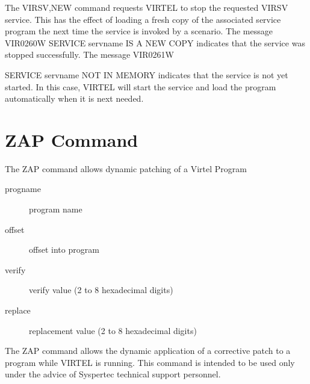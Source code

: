\documentclass[letterpaper,10pt,english]{sphinxmanual}
\begin{document}
The VIRSV,NEW command requests VIRTEL to stop the requested VIRSV service. This has the effect of loading a fresh copy of the associated service program the next time the service is invoked by a scenario. The message VIR0260W SERVICE servname IS A NEW COPY indicates that the service was stopped successfully. The message VIR0261W

SERVICE servname NOT IN MEMORY indicates that the service is not yet started. In this case, VIRTEL will start the service and load the  program automatically when it is next needed.

\ignorespaces 

\section{ZAP Command}
\label{\detokenize{audit_operations_ and_performance:zap-command}}\label{\detokenize{audit_operations_ and_performance:index-33}}
The ZAP command allows dynamic patching of a Virtel Program

\begin{sphinxVerbatim}[commandchars=\\\{\}]
\end{sphinxVerbatim}
\begin{description}
\item[{progname}] \leavevmode
program name

\item[{offset}] \leavevmode
offset into program

\item[{verify}] \leavevmode
verify value (2 to 8 hexadecimal digits)

\item[{replace}] \leavevmode
replacement value (2 to 8 hexadecimal digits)

\end{description}

The ZAP command allows the dynamic application of a corrective patch to a program while VIRTEL is running. This command is intended to be used only under the advice of Syspertec technical support personnel.

\ignorespaces 
\end{document}
